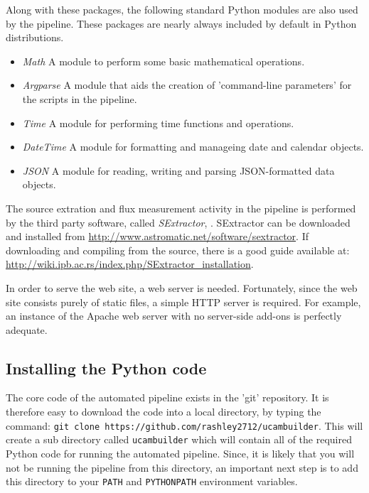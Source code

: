 Along with these packages, the following standard Python modules are also used by the pipeline. These packages are nearly always included by default in Python distributions.
\begin{itemize}
  \item \emph{Math} A module to perform some basic mathematical operations.
  \item \emph{Argparse} A module that aids the creation of 'command-line parameters' for the scripts in the pipeline. 
  \item \emph{Time} A module for performing time functions and operations.
  \item \emph{DateTime} A module for formatting and manageing date and calendar objects.
  \item \emph{JSON} A module for reading, writing and parsing JSON-formatted data objects. 
\end{itemize}

The source extration and flux measurement activity in the pipeline is performed by the third party software, called \emph{SExtractor}, \cite{bertin}. SExtractor can be downloaded and installed from \url{http://www.astromatic.net/software/sextractor}. If downloading and compiling from the source, there is a good guide available at: \url{http://wiki.ipb.ac.rs/index.php/SExtractor_installation}. 

In order to serve the web site, a web server is needed. Fortunately, since the web site consists purely of static files, a simple HTTP server is required. For example, an instance of the Apache web server with no server-side add-ons is perfectly adequate. 

\subsection{Installing the Python code}
The core code of the automated pipeline exists in the 'git' repository. It is therefore easy to download the code into a local directory, by typing the command: \texttt{git clone https://github.com/rashley2712/ucambuilder}.  This will create a sub directory called \texttt{ucambuilder} which will contain all of the required Python code for running the automated pipeline. Since, it is likely that you will not be running the pipeline from this directory, an important next step is to add this directory to your \texttt{PATH} and \texttt{PYTHONPATH} environment variables. 

